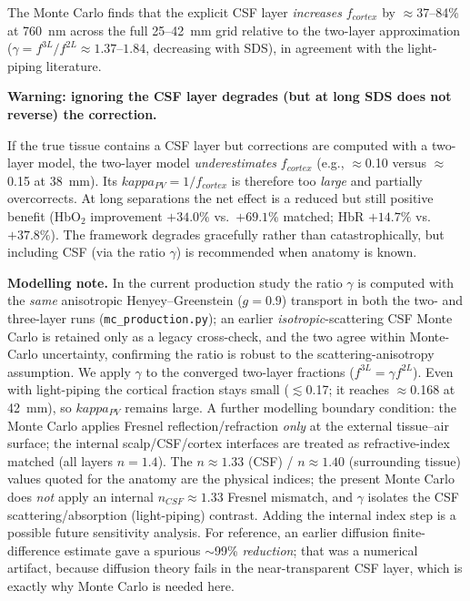 \documentclass[12pt]{article}
\def\kappa{kappa}%
\def\text#1{#1}%
\begin{document}
The Monte Carlo finds that the explicit CSF layer \emph{increases} $f_{\text{cortex}}$ by $\approx$37--84\% at 760~nm across the full 25--42~mm grid relative to the two-layer approximation ($\gamma = f^{\text{3L}}/f^{\text{2L}} \approx 1.37$--$1.84$, decreasing with SDS), in agreement with the light-piping literature.

\begin{caution}
\textbf{Warning: ignoring the CSF layer degrades (but at long SDS does not reverse) the correction.}

If the true tissue contains a CSF layer but corrections are computed with a two-layer model, the two-layer model \emph{underestimates} $f_{\text{cortex}}$ (e.g., $\approx$0.10 versus $\approx$0.15 at 38~mm). Its $\kappa_{\text{PV}} = 1/f_{\text{cortex}}$ is therefore too \emph{large} and partially overcorrects. At long separations the net effect is a reduced but still positive benefit (HbO$_2$ improvement $+34.0\%$ vs.\ $+69.1\%$ matched; HbR $+14.7\%$ vs.\ $+37.8\%$). The framework degrades gracefully rather than catastrophically, but including CSF (via the ratio $\gamma$) is recommended when anatomy is known.
\end{caution}

\begin{caution}
\textbf{Modelling note.} In the current production study the ratio $\gamma$ is computed with the \emph{same} anisotropic Henyey--Greenstein ($g=0.9$) transport in both the two- and three-layer runs (\texttt{mc\_production.py}); an earlier \emph{isotropic}-scattering CSF Monte Carlo is retained only as a legacy cross-check, and the two agree within Monte-Carlo uncertainty, confirming the ratio is robust to the scattering-anisotropy assumption. We apply $\gamma$ to the converged two-layer fractions ($f^{\text{3L}}=\gamma f^{\text{2L}}$). Even with light-piping the cortical fraction stays small ($\lesssim$0.17; it reaches $\approx$0.168 at 42~mm), so $\kappa_{\text{PV}}$ remains large. A further modelling boundary condition: the Monte Carlo applies Fresnel reflection/refraction \emph{only} at the external tissue--air surface; the internal scalp/CSF/cortex interfaces are treated as refractive-index matched (all layers $n=1.4$). The $n\approx1.33$ (CSF) / $n\approx1.40$ (surrounding tissue) values quoted for the anatomy are the physical indices; the present Monte Carlo does \emph{not} apply an internal $n_{\text{CSF}}\approx1.33$ Fresnel mismatch, and $\gamma$ isolates the CSF scattering/absorption (light-piping) contrast. Adding the internal index step is a possible future sensitivity analysis. For reference, an earlier diffusion finite-difference estimate gave a spurious $\sim$99\% \emph{reduction}; that was a numerical artifact, because diffusion theory fails in the near-transparent CSF layer, which is exactly why Monte Carlo is needed here.
\end{caution}
\end{document}
